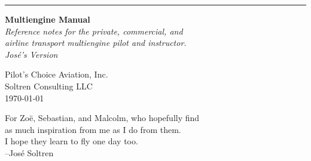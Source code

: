 \documentclass[11pt,twoside,letterpaper,onecolumn]{book}
\newenvironment{dedication}
  {\clearpage           %
   \thispagestyle{empty}%
   \vspace*{\stretch{1}}%
   \itshape             %
   \raggedleft          %
  }
  {\par %
   \vspace{\stretch{3}} %
   \clearpage           %
  }
\begin{document}
\begin{titlepage} %
\raggedleft %
\rule{1pt}{\textheight} %
\hspace{0.05\textwidth} %
\parbox[b]{0.75\textwidth}{ %
{\Huge\bfseries Multiengine Manual}\\[2\baselineskip] %
{\large\textit{Reference notes for the private, commercial, and \\
    airline transport multiengine pilot and instructor. \\
    Jos\'e's Version}}\\[4\baselineskip] %


\vspace{0.5\textheight} %

{\noindent Pilot's Choice Aviation, Inc.\\Soltren Consulting LLC}\\[\baselineskip] %
{\noindent \today }\\[\baselineskip] %
}

\end{titlepage}

\begin{dedication}
For Zo\"e, Sebastian, and Malcolm, who hopefully find\\
as much inspiration from me as I do from them.\\
I hope they learn to fly one day too.\\
--Jos\'e Soltren
\end{dedication}
\end{document}
